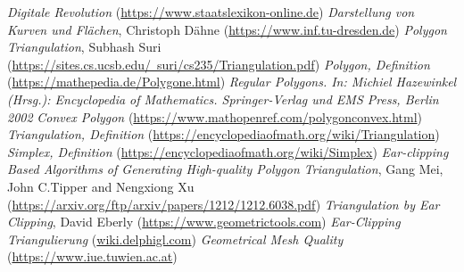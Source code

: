 \documentclass[12pt, twoside]{article}
\begin{document}
\begin{thebibliography}{11}
  \raggedright
  \emph{Digitale Revolution} \break
  (\href{https://www.staatslexikon-online.de/Lexikon/Digitale_Revolution}{https://www.staatslexikon-online.de})
  \emph{Darstellung von Kurven und Flächen}, Christoph Dähne \break
  (\href{https://www.inf.tu-dresden.de/content/institutes/smt/cg/teaching/seminars/ProseminarSS08/cdaehne/ausarbeitung.pdf}{https://www.inf.tu-dresden.de})
  \emph{Polygon Triangulation}, Subhash Suri \break
  (\href{https://sites.cs.ucsb.edu/~suri/cs235/Triangulation.pdf}{https://sites.cs.ucsb.edu/~suri/cs235/Triangulation.pdf}) 
  \emph{Polygon, Definition} \break
  (\href{https://mathepedia.de/Polygone.html}{https://mathepedia.de/Polygone.html})
  \emph{Regular Polygons. In: Michiel Hazewinkel (Hrsg.): Encyclopedia of Mathematics. Springer-Verlag und EMS Press, Berlin 2002}
  \emph{Convex Polygon} \break
  (\href{https://www.mathopenref.com/polygonconvex.html}{https://www.mathopenref.com/polygonconvex.html})
  \emph{Triangulation, Definition} \break
  (\href{https://encyclopediaofmath.org/wiki/Triangulation}{https://encyclopediaofmath.org/wiki/Triangulation})
  \emph{Simplex, Definition} \break
  (\href{https://encyclopediaofmath.org/wiki/Simplex}{https://encyclopediaofmath.org/wiki/Simplex})
  \emph{Ear-clipping Based Algorithms of Generating High-quality Polygon Triangulation}, Gang Mei, John C.Tipper and Nengxiong Xu \break 
  (\href{https://arxiv.org/ftp/arxiv/papers/1212/1212.6038.pdf}{https://arxiv.org/ftp/arxiv/papers/1212/1212.6038.pdf})
  \emph{Triangulation by Ear Clipping}, David Eberly \break 
  (\href{https://www.geometrictools.com/Documentation/TriangulationByEarClipping.pdf}{https://www.geometrictools.com})
  \emph{Ear-Clipping Triangulierung} \break
  (\href{https://wiki.delphigl.com/index.php/Ear_Clipping_Triangulierung}{wiki.delphigl.com})
  \emph{Geometrical Mesh Quality} \break
  (\href{https://www.iue.tuwien.ac.at/phd/fleischmann/node13.html#sec:geoqual}{https://www.iue.tuwien.ac.at})
  
  
  \end{thebibliography}
\end{document}
